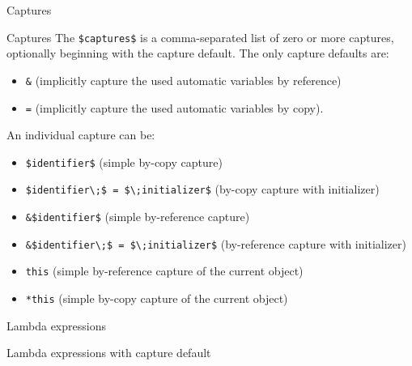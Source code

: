 \begin{frame}{Captures}{}
  \begin{block}{Captures}
    The \lstinline[mathescape]!$captures$! is a comma-separated list of zero or more captures, optionally beginning with the capture default. The only capture defaults are:

    \begin{itemize}
    \item
      \lstinline!&! (implicitly capture the used automatic variables by reference)
    \item
      \lstinline!=! (implicitly capture the used automatic variables by copy).
    \end{itemize}

    An individual capture can be:

    \begin{itemize}
    \item
      \lstinline[mathescape]!$identifier$! (simple by-copy capture)
    \item
      \lstinline[mathescape]!$identifier\;$ = $\;initializer$! (by-copy capture with initializer)
    \item
      \lstinline[mathescape]!&$identifier$! (simple by-reference capture)
    \item
      \lstinline[mathescape]!&$identifier\;$ = $\;initializer$! (by-reference capture with initializer)
    \item
      \lstinline[mathescape]!this! (simple by-reference capture of the current object)
    \item
      \lstinline[mathescape]!*this! (simple by-copy capture of the current object)
    \end{itemize}
  \end{block}
\end{frame}

\begin{frame}{Lambda expressions}{}
  \begin{example}
  \end{example}
\end{frame}

\begin{frame}{Lambda expressions with capture default}{}
  \begin{example}
  \end{example}
\end{frame}

